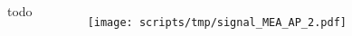    

\begin{frame}{}
    \begin{columns}
        \begin{block}{todo}
            
        \end{block}
        \begin{figure}[H]
                \centering
                \texttt{[image: scripts/tmp/signal\_MEA\_AP\_2.pdf]}
        \end{figure}
    \end{columns}
        

\end{frame}

